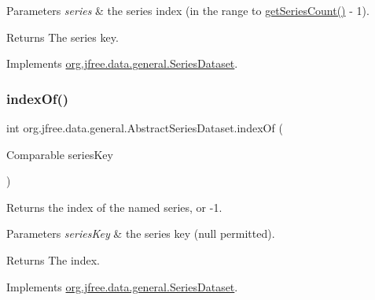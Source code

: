 \begin{DoxyParams}{Parameters}
{\em series} & the series index (in the range {} to {\ttfamily \mbox{\hyperlink{classorg_1_1jfree_1_1data_1_1general_1_1_abstract_series_dataset_ae9bb05e02f26cb1243d7d1ccb8bae3c0}{get\+Series\+Count()}} -\/ 1}).\\
\hline
\end{DoxyParams}
\begin{DoxyReturn}{Returns}
The series key. 
\end{DoxyReturn}


Implements \mbox{\hyperlink{interfaceorg_1_1jfree_1_1data_1_1general_1_1_series_dataset_a60488892b2314a05a012999e26a74178}{org.\+jfree.\+data.\+general.\+Series\+Dataset}}.

\mbox{\label{classorg_1_1jfree_1_1data_1_1general_1_1_abstract_series_dataset_a7ba00e324a49b6a0126c51b0a2c99abb}} 
\subsubsection{\texorpdfstring{index\+Of()}{indexOf()}}
{\footnotesize\ttfamily int org.\+jfree.\+data.\+general.\+Abstract\+Series\+Dataset.\+index\+Of (\begin{DoxyParamCaption}\item[{Comparable}]{series\+Key }\end{DoxyParamCaption})}

Returns the index of the named series, or -\/1.


\begin{DoxyParams}{Parameters}
{\em series\+Key} & the series key ({\ttfamily null} permitted).\\
\hline
\end{DoxyParams}
\begin{DoxyReturn}{Returns}
The index. 
\end{DoxyReturn}


Implements \mbox{\hyperlink{interfaceorg_1_1jfree_1_1data_1_1general_1_1_series_dataset_a8995ed4d70a6c4efe3a4f23318e47046}{org.\+jfree.\+data.\+general.\+Series\+Dataset}}.


